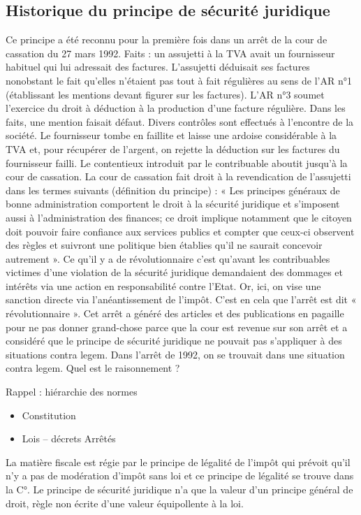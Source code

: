 \documentclass{book}
\begin{document}
\subsection{Historique du principe de sécurité juridique}
Ce principe a été reconnu pour la première fois dans un arrêt de la cour de cassation du 27 mars 1992. 
Faits : un assujetti à la TVA avait un fournisseur habituel qui lui adressait des factures. L’assujetti déduisait ses factures nonobstant le fait qu’elles n’étaient pas tout à fait régulières au sens de l’AR n°1 (établissant les mentions devant figurer sur les factures). L’AR n°3 soumet l’exercice du droit à déduction à la production d’une facture régulière. Dans les faits, une mention faisait défaut. Divers contrôles sont effectués à l’encontre de la société. Le fournisseur tombe en faillite et laisse une ardoise considérable à la TVA et, pour récupérer de l’argent, on rejette la déduction sur les factures du fournisseur failli. Le contentieux introduit par le contribuable aboutit jusqu’à la cour de cassation. La cour de cassation fait droit à la revendication de l’assujetti dans les termes suivants (définition du principe) : « Les principes généraux de bonne administration comportent le droit à la sécurité juridique et s'imposent aussi à l'administration des finances; ce droit implique notamment que le citoyen doit pouvoir faire confiance aux services publics et compter que ceux-ci observent des règles et suivront une politique bien établies qu'il ne saurait concevoir autrement ». Ce qu’il y a de révolutionnaire c’est qu’avant les contribuables victimes d’une violation de la sécurité juridique demandaient des dommages et intérêts via une action en responsabilité contre l’Etat. Or, ici, on vise une sanction directe via l’anéantissement de l’impôt. C’est en cela que l’arrêt est dit « révolutionnaire ». 
Cet arrêt a généré des articles et des publications en pagaille pour ne pas donner grand-chose parce que la cour est revenue sur son arrêt et a considéré que le principe de sécurité juridique ne pouvait pas s’appliquer à des situations contra legem. Dans l’arrêt de 1992, on se trouvait dans une situation contra legem. 
Quel est le raisonnement ? 

Rappel : hiérarchie des normes 
\begin{itemize}
\item Constitution 
\item Lois – décrets
\itel Arrêtés
\end{itemize}
 
La matière fiscale est régie par le principe de légalité de l’impôt qui prévoit qu’il n’y a pas de modération d’impôt sans loi et ce principe de légalité se trouve dans la C°. 
Le principe de sécurité juridique n’a que la valeur d’un principe général de droit, règle non écrite d’une valeur équipollente à la loi. 
\end{document}
